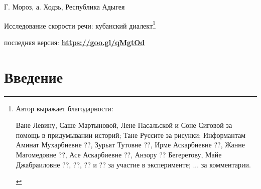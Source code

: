 
\usepackage{alltt}

\begin{flushright}
	{\footnotesize Г. Мороз, а. Ходзь, Республика Адыгея}
\end{flushright}
\begin{center}{\Large Исследование скорости речи: кубанский диалект\footnote{Автор выражает благодарности:
\begin{itemize}
\mytem Ване Левину, Саше Мартыновой, Лене Пасальской и Соне Сиговой за помощь в придумывании историй;
\mytem Тане Руссите за рисунки;
\mytem Информантам Аминат Мухарбиевне ??, Зурьят Тутовне ??, Ирме Аскарбиевне ??, Жанне Магомедовне ??, Асе Аскарбиевне ??, Анзору ?? Бегеретову, Майе Джабраиловне ??, ??, ?? и ?? за участие в эксперименте;
\mytem ... за комментарии.
\end{itemize}}}
\end{center}
{\noindent\footnotesize последняя версия: \textbf{\href{https://goo.gl/qMgtOd}{https://goo.gl/qMgtOd}}}
\vspace{5mm}
\tableofcontents
\vfill
{~}\\
\pagebreak
\section{Введение}
